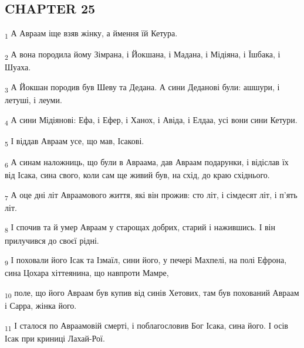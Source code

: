 \subsection{CHAPTER 25}
\begin{tcolorbox}
\textsubscript{1} А Авраам іще взяв жінку, а ймення їй Кетура.
\end{tcolorbox}
\begin{tcolorbox}
\textsubscript{2} А вона породила йому Зімрана, і Йокшана, і Мадана, і Мідіяна, і Їшбака, і Шуаха.
\end{tcolorbox}
\begin{tcolorbox}
\textsubscript{3} А Йокшан породив був Шеву та Дедана. А сини Деданові були: ашшури, і летуші, і леуми.
\end{tcolorbox}
\begin{tcolorbox}
\textsubscript{4} А сини Мідіянові: Ефа, і Ефер, і Ханох, і Авіда, і Елдаа, усі вони сини Кетури.
\end{tcolorbox}
\begin{tcolorbox}
\textsubscript{5} І віддав Авраам усе, що мав, Ісакові.
\end{tcolorbox}
\begin{tcolorbox}
\textsubscript{6} А синам наложниць, що були в Авраама, дав Авраам подарунки, і відіслав їх від Ісака, сина свого, коли сам ще живий був, на схід, до краю східнього.
\end{tcolorbox}
\begin{tcolorbox}
\textsubscript{7} А оце дні літ Авраамового життя, які він прожив: сто літ, і сімдесят літ, і п'ять літ.
\end{tcolorbox}
\begin{tcolorbox}
\textsubscript{8} І спочив та й умер Авраам у старощах добрих, старий і нажившись. І він прилучився до своєї рідні.
\end{tcolorbox}
\begin{tcolorbox}
\textsubscript{9} І поховали його Ісак та Ізмаїл, сини його, у печері Махпелі, на полі Ефрона, сина Цохара хіттеянина, що навпроти Мамре,
\end{tcolorbox}
\begin{tcolorbox}
\textsubscript{10} поле, що його Авраам був купив від синів Хетових, там був похований Авраам і Сарра, жінка його.
\end{tcolorbox}
\begin{tcolorbox}
\textsubscript{11} І сталося по Авраамовій смерті, і поблагословив Бог Ісака, сина його. І осів Ісак при криниці Лахай-Рої.
\end{tcolorbox}
